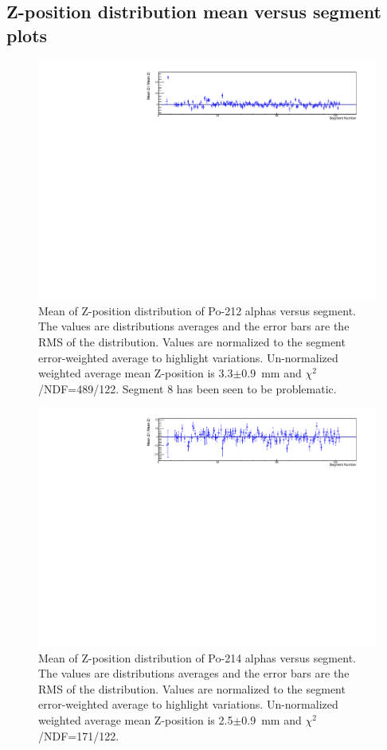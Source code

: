 \subsection{Z-position distribution mean versus segment plots}
\begin{figure}[!h]
\centering
\includegraphics[width=1.05\textwidth]{figures/PubBiPo212meanZvsCell.pdf}
\caption{\label{fig:meanZvsCell212}Mean of Z-position distribution of Po-212 alphas versus segment. The values are distributions averages and the error bars are the RMS of the distribution. Values are normalized to the segment error-weighted average to highlight variations. Un-normalized weighted average mean Z-position is 3.3$\pm$0.9~mm and $\chi^2$/NDF=489/122. Segment 8 has been seen to be problematic.}
\end{figure}
\begin{figure}[!h]
\centering
\includegraphics[width=1.05\textwidth]{figures/PubBiPo214meanZvsCell.pdf}
\caption{\label{fig:meanZvsCell214}Mean of Z-position distribution of Po-214 alphas versus segment. The values are distributions averages and the error bars are the RMS of the distribution. Values are normalized to the segment error-weighted average to highlight variations. Un-normalized weighted average mean Z-position is 2.5$\pm$0.9~mm and $\chi^2$/NDF=171/122.}
\end{figure}
\newpage
